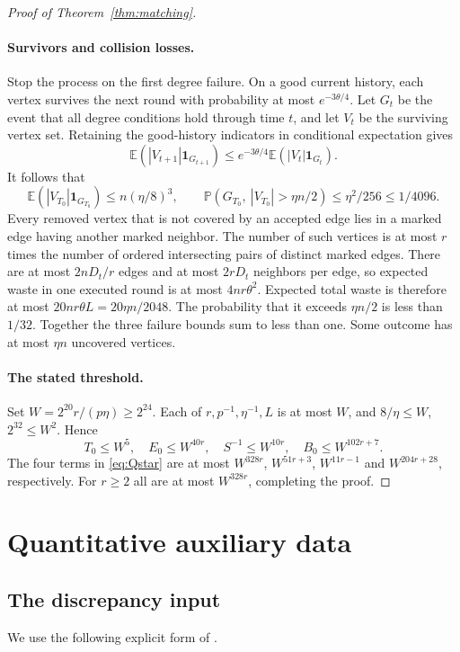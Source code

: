 \documentclass[11pt]{article}
\theoremstyle{remark}
\newcommand{\E}{\mathbb E}
\newcommand{\Prob}{\mathbb P}
\begin{document}
\begin{proof}[Proof of Theorem~\ref{thm:matching}]
\paragraph{Survivors and collision losses.}
Stop the process on the first degree failure. On a good current history,
each vertex survives the next round with probability at most
$e^{-3\theta/4}$. Let $G_t$ be the event that all degree conditions hold
through time $t$, and let $V_t$ be the surviving vertex set. Retaining the
good-history indicators in conditional expectation gives
\[
 \E(|V_{t+1}|\mathbf1_{G_{t+1}})
 \le e^{-3\theta/4}\E(|V_t|\mathbf1_{G_t}).
\]
It follows that
\[
 \E(|V_{T_0}|\mathbf1_{G_{T_0}})\le n(\eta/8)^3,
 \qquad
 \Prob(G_{T_0},\ |V_{T_0}|>\eta n/2)\le\eta^2/256\le1/4096.
\]
Every removed vertex that is not covered by an accepted edge lies in a
marked edge having another marked neighbor. The number of such vertices
is at most $r$ times the number of ordered intersecting pairs of distinct
marked edges. There are at most $2nD_t/r$ edges and at most $2rD_t$
neighbors per edge, so expected waste in one executed round is at most
$4nr\theta^2$. Expected total waste is therefore at most
$20nr\theta L=20\eta n/2048$. The probability that it exceeds $\eta n/2$
is less than $1/32$. Together the three failure bounds sum to less than
one. Some outcome has at most $\eta n$ uncovered vertices.

\paragraph{The stated threshold.}
Set $W=2^{20}r/(p\eta)\ge2^{24}$. Each of $r,p^{-1},\eta^{-1},L$ is at
most $W$, and $8/\eta\le W$, $2^{32}\le W^2$. Hence
\[
 T_0\le W^5,\quad E_0\le W^{40r},\quad S^{-1}\le W^{10r},
 \quad B_0\le W^{102r+7}.
\]
The four terms in \eqref{eq:Qstar} are at most
$W^{328r}$, $W^{51r+3}$, $W^{11r-1}$ and $W^{204r+28}$, respectively.
For $r\ge2$ all are at most $W^{328r}$, completing the proof.
\end{proof}

\section{Quantitative auxiliary data}\label{sec:auxiliary}

\subsection{The discrepancy input}

We use the following explicit form of \cite[Lemma 3.2]{main}.
\end{document}
